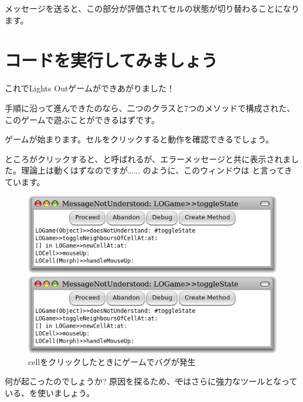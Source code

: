 \documentclass[a4paper,10pt,twoside]{book}
\begin{document}

\noindent
{}メッセージを送ると、この部分が評価されてセルの状態が切り替わることになります。

\section{コードを実行してみましょう}

これでLights Outゲームができあがりました！

手順に沿って進んできたのなら、二つのクラスと7つのメソッドで構成された、このゲームで遊ぶことができるはずです。


ゲームが始まります。セルをクリックすると動作を確認できるでしょう。

ところがクリックすると、と呼ばれるが、エラーメッセージと共に表示されました。理論上は動くはずなのですが\ldots{}... のように、このウィンドウは と言ってきています。

\begin{figure}[ht]
\ifluluelse
	{\centerline{\includegraphics[width=\textwidth]{Error}}}
	{\centerline{\includegraphics[scale=0.7]{Error}}}
\caption{cellをクリックしたときにゲームでバグが発生
}
\end{figure}

\noindent
何が起こったのでしょうか? 原因を探るため、\st ではさらに強力なツールとなっている、を使いましょう。
\end{document}
